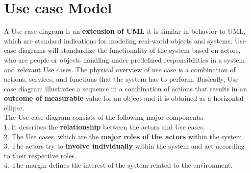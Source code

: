 \documentclass[a4paper, 11pt]{article}
\begin{document}
\section{Use case Model}
A Use case diagram is an \textbf{extension of UML} it is similar in behavior to UML, which are standard indications for modeling real-world objects and systems. Use case diagrams will standardize the functionality of the system based on actors, who are people or objects handling under predefined responsibilities in a system and relevant Use cases. The physical overview of use case is a combination of actions, services, and functions that the system has to perform. Basically, Use case diagram illustrates a sequence in a combination of actions that results in an \textbf{outcome of measurable} value for an object and it is obtained as a horizontal ellipse. \\
The Use case diagram consists of the following major components:\\
1. It describes the \textbf{relationship} between the actors and Use cases.\\
2. The Use cases, which are the \textbf{major roles of the actors} within the system.\\
3. The actors try to \textbf{involve individually} within the system and act according to their respective roles.\\
4. The margin defines the interest of the system related to the environment.\\ \\
\end{document}
